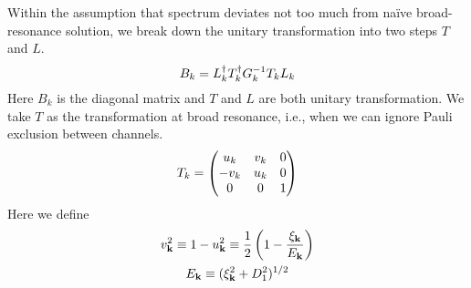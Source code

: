 Within the assumption that spectrum  deviates not too much from na\"{i}ve broad-resonance solution, we  break down the unitary transformation into two steps $T$ and $L$. 
\begin{equation}\label{eq:pathInt2:B}
B_k=L_k^{\dagger}T_k^{\dagger}G_k^{-1}T_kL_k
\end{equation} 
Here $B_{k}$ is the diagonal matrix and $T$ and $L$ are both unitary transformation.  We take $T$ as the transformation at broad resonance, i.e., when we can ignore Pauli exclusion between channels. 
\begin{equation}\label{eq:pathInt2:T}
T_k=\begin{pmatrix}u_k&v_k&0\\-v_k&u_k&0\\0&0&1\end{pmatrix}
\end{equation}
Here we define 
\begin{gather}
v_{\mathbf{k}}^{2}\equiv1-u_{\mathbf{k}}^{2}\equiv\frac{1}{2}\left(1-\frac{\xi_{\mathbf{k}}}{E_{\mathbf{k}}}\right)\\
E_{\mathbf{k}}\equiv(\xi_{\mathbf{k}}^{2}+D_{1}^{2})^{1/2}
\end{gather}

